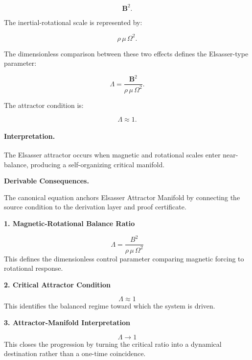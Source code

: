 \begin{equation}
\mathbf{B}^2 .
\end{equation}

The inertial-rotational scale is represented by:

\begin{equation}
\rho\,\mu\,\Omega^2 .
\end{equation}

The dimensionless comparison between these two effects defines the Elsasser-type parameter:

\begin{equation}
\boxed{
\Lambda
=
\frac{\mathbf{B}^2}
{\rho\,\mu\,\Omega^2}.
}
\end{equation}

The attractor condition is:

\begin{equation}
\Lambda \approx 1 .
\end{equation}

\paragraph{Interpretation.}
The Elsasser attractor occurs when magnetic and rotational scales enter near-balance, producing a self-organizing critical manifold.

\par\vspace{0.35em}
\noindent\textbf{Derivable Consequences.}\quad
\begingroup
\footnotesize
\raggedright
The canonical equation anchors Elsasser Attractor Manifold by connecting the source condition to the derivation layer and proof certificate.
\par\endgroup

\noindent\textbf{1. Magnetic-Rotational Balance Ratio}\par
\[
\Lambda
=
\frac{B^{2}}{\rho\,\mu\,\Omega^{2}}
\]
\noindent This defines the dimensionless control parameter comparing magnetic forcing to rotational response.\par
\noindent\textbf{2. Critical Attractor Condition}\par
\[
\Lambda \approx 1
\]
\noindent This identifies the balanced regime toward which the system is driven.\par
\noindent\textbf{3. Attractor-Manifold Interpretation}\par
\[
\Lambda \to 1
\]
\noindent This closes the progression by turning the critical ratio into a dynamical destination rather than a one-time coincidence.\par

